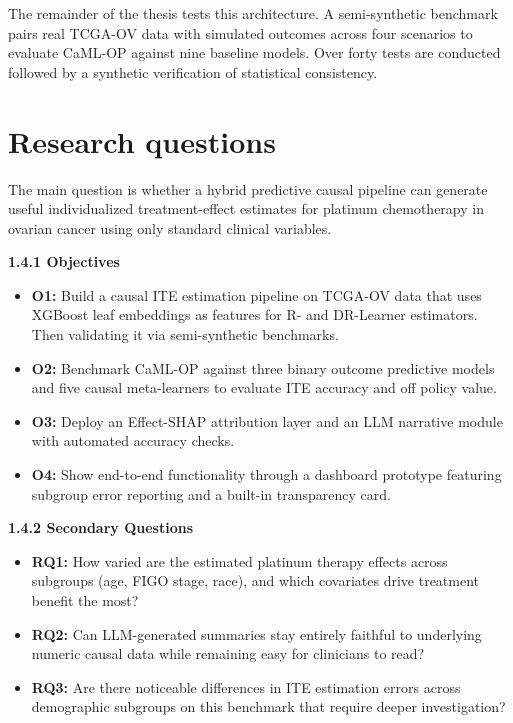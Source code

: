 The remainder of the thesis tests this architecture. A semi-synthetic benchmark pairs real TCGA-OV data with simulated outcomes across four scenarios to evaluate CaML-OP against nine baseline models. Over forty tests are conducted followed by a synthetic verification of statistical consistency.

\section{Research questions}\label{research-questions}

The main question is whether a hybrid predictive causal pipeline can generate useful individualized treatment-effect estimates for platinum chemotherapy in ovarian cancer using only standard clinical variables.

\textbf{1.4.1 Objectives}

\begin{itemize}
\item
 \textbf{O1:} Build a causal ITE estimation pipeline on TCGA-OV data that uses XGBoost leaf embeddings as features for R- and DR-Learner estimators. Then validating it via semi-synthetic benchmarks.
\item
 \textbf{O2:} Benchmark CaML-OP against three binary outcome predictive models and five causal meta-learners to evaluate ITE accuracy and off policy value.
\item
 \textbf{O3:} Deploy an Effect-SHAP attribution layer and an LLM narrative module with automated accuracy checks.
\item
 \textbf{O4:} Show end-to-end functionality through a dashboard prototype featuring subgroup error reporting and a built-in transparency card.
\end{itemize}

\textbf{1.4.2 Secondary Questions}

\begin{itemize}
\item
 \textbf{RQ1:} How varied are the estimated platinum therapy effects across subgroups (age, FIGO stage, race), and which covariates drive treatment benefit the most?
\item
 \textbf{RQ2:} Can LLM-generated summaries stay entirely faithful to underlying numeric causal data while remaining easy for clinicians to read?
\item
 \textbf{RQ3:} Are there noticeable differences in ITE estimation errors across demographic subgroups on this benchmark that require deeper investigation?
\end{itemize}

